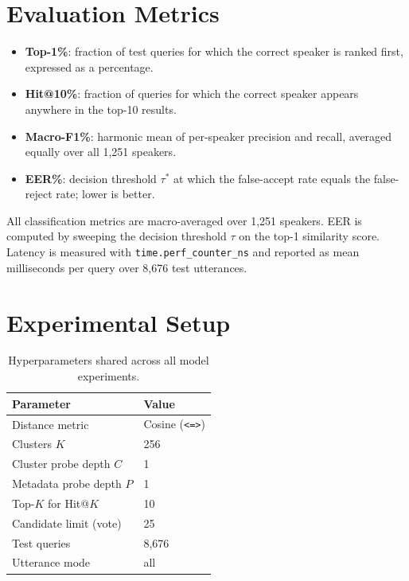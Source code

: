\documentclass[12pt, a4paper]{article}
\newcommand{\code}[1]{\texttt{#1}}
\begin{document}
\section{Evaluation Metrics}
\label{sec:metrics}

\begin{itemize}
  \item \textbf{Top-1\%}: fraction of test queries for which the correct speaker is ranked first, expressed as a percentage.
  \item \textbf{Hit@10\%}: fraction of queries for which the correct speaker appears anywhere in the top-10 results.
  \item \textbf{Macro-F1\%}: harmonic mean of per-speaker precision and recall, averaged equally over all 1,251 speakers.
  \item \textbf{EER\%}: decision threshold $\tau^*$ at which the false-accept rate equals the false-reject rate; lower is better.
\end{itemize}


All classification metrics are macro-averaged over 1,251 speakers.
EER is computed by sweeping the decision threshold $\tau$ on the
top-1 similarity score.
Latency is measured with \code{time.perf\_counter\_ns} and reported
as mean milliseconds per query over 8,676 test utterances.

\section{Experimental Setup}
\label{sec:setup}

\begin{table}[H]
\centering
\caption{Hyperparameters shared across all model experiments.}
\label{tab:hyperparams}
\begin{tabular}{ll}
\toprule
\textbf{Parameter} & \textbf{Value} \\
\midrule
Distance metric               & Cosine (\code{<=>}) \\
Clusters $K$                  & 256 \\
Cluster probe depth $C$       & 1 \\
Metadata probe depth $P$      & 1 \\
Top-$K$ for Hit@$K$           & 10 \\
Candidate limit (vote)        & 25 \\
Test queries                  & 8,676 \\
Utterance mode                & all \\
\bottomrule
\end{tabular}
\end{table}
\end{document}
